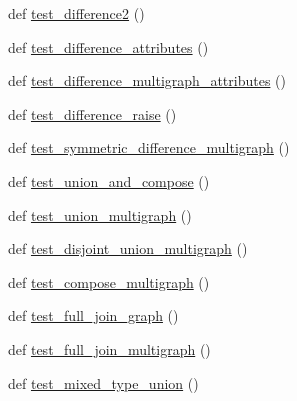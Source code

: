 \begin{DoxyCompactItemize}
def \hyperlink{namespacenetworkx_1_1algorithms_1_1operators_1_1tests_1_1test__binary_a9b2d089915ca9047e2749e6e2ea203d7}{test\+\_\+difference2} ()
\item 
def \hyperlink{namespacenetworkx_1_1algorithms_1_1operators_1_1tests_1_1test__binary_af823e53080007aae17cd5cc83ce20c16}{test\+\_\+difference\+\_\+attributes} ()
\item 
def \hyperlink{namespacenetworkx_1_1algorithms_1_1operators_1_1tests_1_1test__binary_a491c96cd93c2ceed8578c4b6c46ddd5d}{test\+\_\+difference\+\_\+multigraph\+\_\+attributes} ()
\item 
def \hyperlink{namespacenetworkx_1_1algorithms_1_1operators_1_1tests_1_1test__binary_ac37c4eb15c090858bb4b34d7ba7dfd03}{test\+\_\+difference\+\_\+raise} ()
\item 
def \hyperlink{namespacenetworkx_1_1algorithms_1_1operators_1_1tests_1_1test__binary_a827172d92cf76593930bfd054aaf475b}{test\+\_\+symmetric\+\_\+difference\+\_\+multigraph} ()
\item 
def \hyperlink{namespacenetworkx_1_1algorithms_1_1operators_1_1tests_1_1test__binary_a7ab4b51972842754af6cbef4a52e9ff4}{test\+\_\+union\+\_\+and\+\_\+compose} ()
\item 
def \hyperlink{namespacenetworkx_1_1algorithms_1_1operators_1_1tests_1_1test__binary_ae8fa0308962bba9eea4df76f470b5e0f}{test\+\_\+union\+\_\+multigraph} ()
\item 
def \hyperlink{namespacenetworkx_1_1algorithms_1_1operators_1_1tests_1_1test__binary_adb596eb855c6fcdd7d11949105796229}{test\+\_\+disjoint\+\_\+union\+\_\+multigraph} ()
\item 
def \hyperlink{namespacenetworkx_1_1algorithms_1_1operators_1_1tests_1_1test__binary_aaf94d50cce8a2aedbef19aac4a8b6cd4}{test\+\_\+compose\+\_\+multigraph} ()
\item 
def \hyperlink{namespacenetworkx_1_1algorithms_1_1operators_1_1tests_1_1test__binary_a7fcdc4215f4f198f6d2ef2695ffb2867}{test\+\_\+full\+\_\+join\+\_\+graph} ()
\item 
def \hyperlink{namespacenetworkx_1_1algorithms_1_1operators_1_1tests_1_1test__binary_abbcf80e3c9ea4498b9043429ec05f976}{test\+\_\+full\+\_\+join\+\_\+multigraph} ()
\item 
def \hyperlink{namespacenetworkx_1_1algorithms_1_1operators_1_1tests_1_1test__binary_aed0f0f815096e9386adc9e6b70a218d5}{test\+\_\+mixed\+\_\+type\+\_\+union} ()
\end{DoxyCompactItemize}


